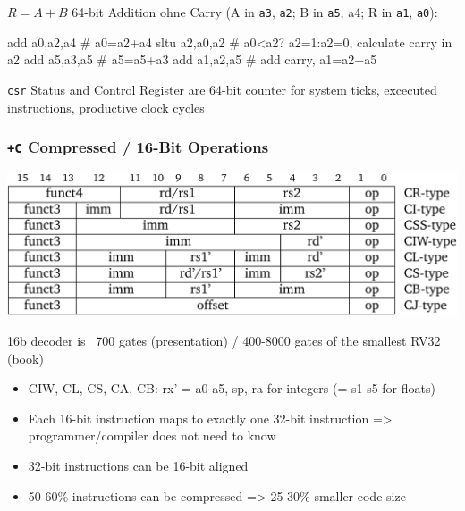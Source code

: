 \documentclass[
  10pt,
  a4paper,
]{article}
\newenvironment{Shaded}{}{}
\newcommand{\NormalTok}[1]{\textcolor[rgb]{0.14,0.16,0.18}{#1}}
\providecommand{\tightlist}{%
  \setlength{\itemsep}{0pt}\setlength{\parskip}{0pt}}\usepackage{longtable,booktabs,array}
\begin{document}
\begin{multicols*}{2}
\begin{tcolorbox}
\(R=A+B\) 64-bit Addition ohne Carry (A in \texttt{a3}, \texttt{a2}; B
in \texttt{a5}, a4; R in \texttt{a1}, \texttt{a0}):

\begin{Shaded}
\begin{Highlighting}[]
\NormalTok{add a0,a2,a4  \# a0=a2+a4}
\NormalTok{sltu a2,a0,a2 \# a0\textless{}a2? a2=1:a2=0, calculate carry in a2}
\NormalTok{add a5,a3,a5  \# a5=a5+a3}
\NormalTok{add a1,a2,a5  \# add carry, a1=a2+a5}
\end{Highlighting}
\end{Shaded}

\end{tcolorbox}

\texttt{csr} Status and Control Register are 64-bit counter for system
ticks, excecuted instructions, productive clock cycles

\subsubsection{\texorpdfstring{\texttt{+C} Compressed / 16-Bit
Operations}{+C Compressed / 16-Bit Operations}}\label{c-compressed-16-bit-operations}

\includegraphics{images/performance/image-1.png}

{\footnotesize 16b decoder is ~700 gates (presentation) / 400-8000 gates of the smallest RV32 (book)}

\begin{itemize}
\tightlist
\item
  CIW, CL, CS, CA, CB: rx' = a0-a5, sp, ra for integers (= s1-s5 for
  floats)
\item
  Each 16-bit instruction maps to exactly one 32-bit instruction
  =\textgreater{} programmer/compiler does not need to know
\item
  32-bit instructions can be 16-bit aligned
\item
  50-60\% instructions can be compressed =\textgreater{} 25-30\% smaller
  code size
\end{itemize}


\end{multicols*}
\end{document}
